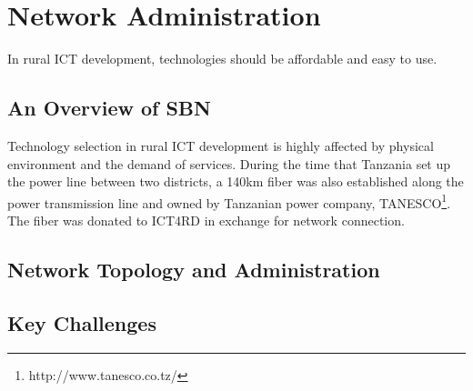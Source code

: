 \chapter{Network Administration}
In rural ICT development, technologies should be affordable and easy to use.
\section{An Overview of SBN}
Technology selection in rural ICT development is highly affected by physical environment and the demand of services. 
During the time that Tanzania set up the power line between two districts, a 140km fiber was also established along the power transmission line and owned by Tanzanian power company, TANESCO\footnote{http://www.tanesco.co.tz/}. The fiber was donated to ICT4RD in exchange for network connection. 
\section{Network Topology and Administration}
\section{Key Challenges}
